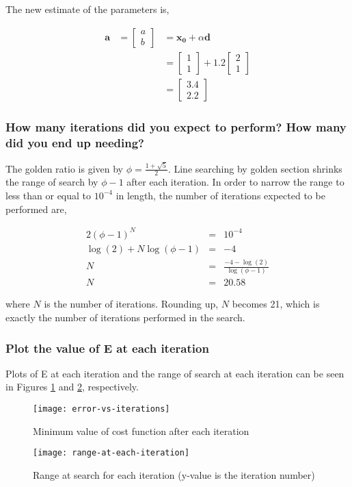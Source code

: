\documentclass{article}
\begin{document}
The new estimate of the parameters is,

\begin{eqnarray*}
\mathbf{a} &= \begin{bmatrix} a \\ b \end{bmatrix} &= \mathbf{x_0} + \alpha \mathbf{d} \\
&&= \begin{bmatrix} 1 \\ 1 \end{bmatrix} + 1.2 \begin{bmatrix} 2 \\ 1 \end{bmatrix} \\
&&= \begin{bmatrix} 3.4 \\ 2.2 \end{bmatrix}
\end{eqnarray*}

\subsubsection{How many iterations did you expect to perform? How many did you end up needing?}

The golden ratio is given by $\phi = \frac{1 + \sqrt{5}}{2}$.
Line searching by golden section shrinks the range of search by $\phi-1$ after each iteration.
In order to narrow the range to less than or equal to $10^{-4}$ in length, the number of iterations expected to be performed are,

\begin{eqnarray*}
2 (\phi - 1)^N &=& 10^{-4} \\
\log(2) + N \log(\phi-1) &=& -4\\
N &=& \frac{-4 - \log(2)}{\log(\phi-1)}\\
N &=& 20.58
\end{eqnarray*}

\noindent where $N$ is the number of iterations.
Rounding up, $N$ becomes 21, which is exactly the number of iterations performed in the search.

\subsubsection{Plot the value of E at each iteration}

Plots of E at each iteration and the range of search at each iteration can be seen in Figures \ref{fig:error} and \ref{fig:range}, respectively.

\begin{figure}
	\centering
	\texttt{[image: error-vs-iterations]}
	\caption{Minimum value of cost function after each iteration}
	\label{fig:error}
\end{figure}

\begin{figure}
	\centering
	\texttt{[image: range-at-each-iteration]}
	\caption{Range at search for each iteration (y-value is the iteration number)}
	\label{fig:range}
\end{figure}
\end{document}
